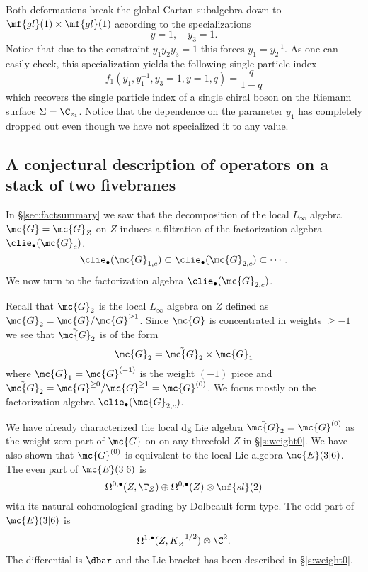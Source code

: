 Both deformations break the global Cartan subalgebra down to $\mf{gl}(1) \times \mf{gl}(1)$ according to the specializations
\begin{equation}\label{eqn:special1}
y=1 , \quad y_3 = 1 .
\end{equation}
Notice that due to the constraint $y_1y_2y_3=1$ this forces $y_1 = y_2^{-1}$.
As one can easily check, this specialization yields the following single particle index
\[
f_{1}(y_1, y_1^{-1},y_3=1, y=1, q) = \frac{q}{1-q} 
\]
which recovers the single particle index of a single chiral boson on the Riemann surface $\Sigma = \C_{z_1}$. 
Notice that the dependence on the parameter $y_1$ has completely dropped out even though we have not specialized it to any value.

\subsection{A conjectural description of operators on a stack of two fivebranes}

In \S\ref{sec:factsummary} we saw that the decomposition of the local $L_\infty$ algebra $\mc{G} = \mc{G}_Z$ on $Z$ induces a filtration of the factorization algebra $\clie_\bullet(\mc{G}_c)$. 
\[
\clie_{\bullet}(\mc{G}_{1,c}) \subset \clie_{\bullet}(\mc{G}_{2,c}) \subset \cdots .
\]
We now turn to the factorization algebra $\clie_{\bullet}(\mc{G}_{2,c})$.

Recall that $\mc{G}_{2}$ is the local $L_\infty$ algebra on $Z$ defined as $\mc{G}_{2} = \mc{G} / \mc{G}^{\geq 1}$. 
Since $\mc{G}$ is concentrated in weights $\geq -1$ we see that $\tilde {\mc{G}}_{2}$ is of the form
\[
\mc{G}_2 = \tilde {\mc{G}}_2 \ltimes \mc{G}_1 
\]
where $\mc{G}_1 = \mc{G}^{(-1)}$ is the weight $(-1)$ piece and $\tilde {\mc{G}}_2 = \mc{G}^{\geq 0} / \mc{G}^{\geq 1} = \mc{G}^{(0)}$.  
We focus mostly on the factorization algebra $\clie_\bullet(\tilde {\mc{G}}_{2,c})$.

We have already characterized the local dg Lie algebra $\tilde {\mc{G}}_{2} = \mc{G}^{(0)}$ as the weight zero part of $\mc{G}$ on on any threefold $Z$ in \S\ref{s:weight0}. 
We have also shown that $\mc{G}^{(0)}$ is equivalent to the local Lie algebra $\mc{E}(3|6)$. 
The even part of $\mc{E}(3|6)$ is
\[
\Omega^{0,\bullet}(Z, \T_Z) \oplus \Omega^{0,\bullet}(Z) \otimes \mf{sl}(2) 
\]
with its natural cohomological grading by Dolbeault form type. 
The odd part of $\mc{E}(3|6)$ is
\[
\Omega^{1,\bullet}(Z, K_Z^{-1/2}) \otimes \C^2 .
\]
The differential is $\dbar$ and the Lie bracket has been described in \S\ref{s:weight0}.

